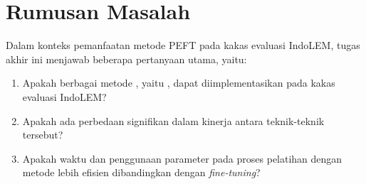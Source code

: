 \section{Rumusan Masalah}

Dalam konteks pemanfaatan metode PEFT pada kakas evaluasi IndoLEM, tugas akhir ini menjawab beberapa pertanyaan utama, yaitu:

\begin{enumerate}
    \item Apakah berbagai metode \PEFT, yaitu \methodPEFT, dapat diimplementasikan pada kakas evaluasi IndoLEM?
    \item Apakah ada perbedaan signifikan dalam kinerja antara teknik-teknik \PEFT tersebut?
    \item Apakah waktu dan penggunaan parameter pada proses pelatihan dengan metode \PEFT lebih efisien dibandingkan dengan \textit{fine-tuning}?
\end{enumerate}
